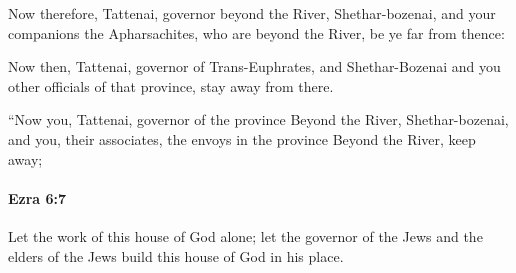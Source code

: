 			\begin{versebox}
					\item[BHS] 
					\item[LXX] 
					\item[ASV] Now therefore, Tattenai, governor beyond the River, Shethar-bozenai, and your companions the Apharsachites, who are beyond the River, be ye far from thence:
					\item[NIV] Now then, Tattenai, governor of Trans-Euphrates, and Shethar-Bozenai and you other officials of that province, stay away from there.
					\item[NRSV] “Now you, Tattenai, governor of the province Beyond the River, Shethar-bozenai, and you, their associates, the envoys in the province Beyond the River, keep away;
			\end{versebox}

		\paragraph{Ezra 6:7} %
			\label{EZRA-6-7}

			Let the work of this house of God alone; let the governor of the Jews and the elders of the Jews build this house of God in his place.


